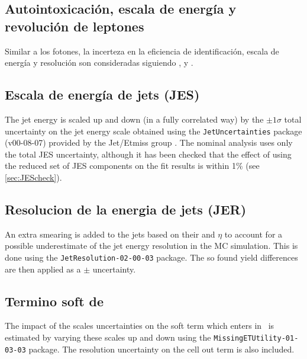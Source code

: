 


\subsection{Autointoxicación, escala de energía y revolución de leptones}\label{sec:syst_leptonid}

Similar a los fotones, la incerteza en la eficiencia de identificación, escala de
energía y resolución son consideradas siguiendo \cite{EleEffTwiki}, \cite{EGScaleTwiki}
y \cite{MCPTwiki}.

\subsection{Escala de energía de jets (JES)}
The jet energy is scaled up and down (in a fully correlated way) by the $\pm1\sigma$ total uncertainty on the jet energy scale obtained
using the {\small \texttt{JetUncertainties}} package (v00-08-07) provided by the Jet/Etmiss group \cite{JesTwiki}. The nominal analysis
uses only the total JES uncertainty, although it has been checked that the effect of using the reduced set of JES components on the fit
results is within 1\% (see \Sec \ref{sec:JEScheck}).

\subsection{Resolucion de la energia de jets (JER)}
 An extra \pt smearing is added to the jets based on their \pt and $\eta$ to account
for a possible underestimate of the jet energy resolution in the MC simulation. This is done using the
\texttt{JetResolution-02-00-03} package. The so found yield differences are then applied as a $\pm$ uncertainty.

\subsection{Termino soft de \MET}
The impact of the scales uncertainties on the soft term which enters in \MET\ is estimated by varying these
scales up and down using the \texttt{MissingETUtility-01-03-03} package. The resolution uncertainty on the cell out term is also included.

